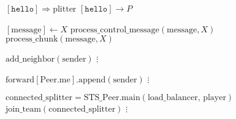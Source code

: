 \documentclass{article}
\begin{document}
\pagestyle{empty}

\newcommand{\send}{\Rightarrow}
\newcommand{\sendto}{\rightarrow}
\algrenewcommand\textproc{\textrm}

\begin{algorithmic}
  \algrenewcommand{}
  
  \State $[\mathtt{hello}] \send \text{plitter}$
  \State $[\mathtt{hello}] \sendto P$
  \EndFor
  \EndFunction

  \State $[\text{message}] \gets X$
  \State $\text{process\_control\_message}(\text{message}, X)$
  \Else
  \State $\text{process\_chunk}(\text{message}, X)$
  \EndIf
  \EndFunction
  
  \State $\text{add\_neighbor}(\text{sender})$
  \EndIf
  \State $\vdots$
  \EndFunction

  \State $\text{forward}[\text{Peer.me}].\text{append}(\text{sender})$
  \State $\vdots$
  \EndFunction

  \State $\text{connected\_splitter}=\text{STS\_Peer.main}(\text{load\_balancer, player})$
  \State $\text{join\_team}(\text{connected\_splitter})$
  \State $\vdots$
  \EndFunction
  
  \EndProcedure
\end{algorithmic}
\end{document}
